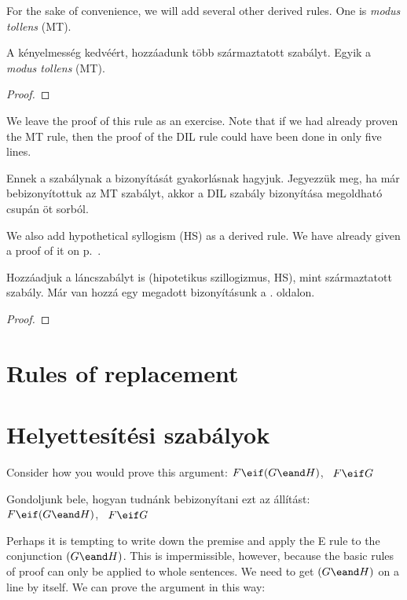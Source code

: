 For the sake of convenience, we will add several other derived rules. One is \emph{modus tollens} (MT).

A kényelmesség kedvéért, hozzáadunk több származtatott szabályt. Egyik a \emph{modus tollens} (MT).

\begin{proof}
	 
\end{proof}

We leave the proof of this rule as an exercise. Note that if we had already proven the MT rule, then the proof of the DIL rule could have been done in only five lines.

Ennek a szabálynak a bizonyítását gyakorlásnak hagyjuk. Jegyezzük meg, ha már bebizonyítottuk az MT szabályt, akkor a DIL szabály bizonyítása megoldható csupán öt sorból.

We also add hypothetical syllogism (HS) as a derived rule. We have already given a proof of it on p.~\pageref{HSproof}.

Hozzáadjuk a láncszabályt is (hipotetikus szillogizmus, HS), mint származtatott szabály. Már van hozzá egy megadott bizonyításunk a \pageref{HSproof}. oldalon.

\begin{proof}
\end{proof}


\section*{Rules of replacement}
\section{Helyettesítési szabályok}
Consider how you would prove this argument: $F\eif(G\eand H)$, \therefore\ $F\eif G$

Gondoljunk bele, hogyan tudnánk bebizonyítani ezt az állítást: $F\eif(G\eand H)$, \therefore\ $F\eif G$

Perhaps it is tempting to write down the premise and apply the {\eand}E rule to the conjunction $(G \eand H)$. This is impermissible, however, because the basic rules of proof can only be applied to whole sentences. We need to get $(G \eand H)$ on a line by itself. We can prove the argument in this way:

